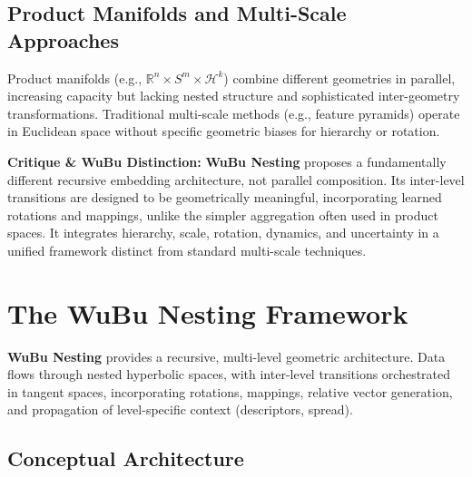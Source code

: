 \documentclass[11pt, twoside]{article} %
\newcommand{\R}{\mathbb{R}} %
\newcommand{\wubu}{\textbf{WuBu Nesting}} %
\begin{document}
\subsection{Product Manifolds and Multi-Scale Approaches}
\label{subsec:product_multiscale}

Product manifolds \cite{GuEtAl2019} (e.g., $\R^n \times S^m \times \mathcal{H}^k$) combine different geometries in parallel, increasing capacity but lacking nested structure and sophisticated inter-geometry transformations. Traditional multi-scale methods (e.g., feature pyramids) operate in Euclidean space without specific geometric biases for hierarchy or rotation.

\textbf{Critique \& WuBu Distinction:} \wubu{} proposes a fundamentally different recursive embedding architecture, not parallel composition. Its inter-level transitions are designed to be geometrically meaningful, incorporating learned rotations and mappings, unlike the simpler aggregation often used in product spaces. It integrates hierarchy, scale, rotation, dynamics, and uncertainty in a unified framework distinct from standard multi-scale techniques.

\section{The WuBu Nesting Framework}
\label{sec:framework}

\wubu{} provides a recursive, multi-level geometric architecture. Data flows through nested hyperbolic spaces, with inter-level transitions orchestrated in tangent spaces, incorporating rotations, mappings, relative vector generation, and propagation of level-specific context (descriptors, spread).

\subsection{Conceptual Architecture}
\label{subsec:conceptual_architecture}
\end{document}
